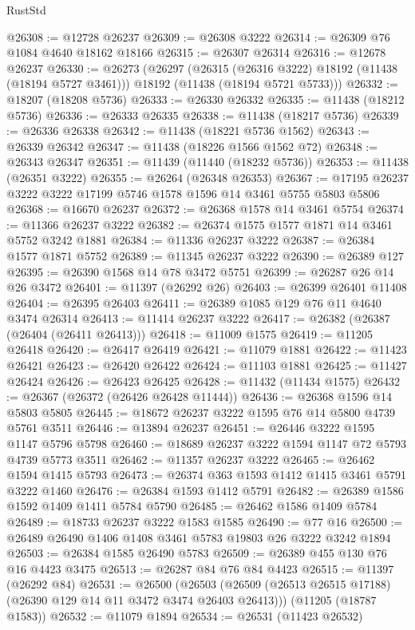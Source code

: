 \begin{lexlean}{RustStd}
\begin{coremodule}
@26308 := @12728 @26237
@26309 := @26308 @3222
@26314 := @26309 @76 @1084 @4640 @18162 @18166
@26315 := @26307 @26314
@26316 := @12678 @26237
@26330 := @26273
    (@26297
      (@26315 (@26316 @3222) @18192 (@11438 (@18194 @5727 @3461)))
      @18192
      (@11438 (@18194 @5721 @5733)))
@26332 := @18207 (@18208 @5736)
@26333 := @26330 @26332
@26335 := @11438 (@18212 @5736)
@26336 := @26333 @26335
@26338 := @11438 (@18217 @5736)
@26339 := @26336 @26338
@26342 := @11438 (@18221 @5736 @1562)
@26343 := @26339 @26342
@26347 := @11438 (@18226 @1566 @1562 @72)
@26348 := @26343 @26347
@26351 := @11439 (@11440 (@18232 @5736))
@26353 := @11438 (@26351 @3222)
@26355 := @26264 (@26348 @26353)
@26367 := @17195 @26237 @3222 @3222 @17199 @5746 @1578 @1596 @14 @3461 @5755 @5803 @5806
@26368 := @16670 @26237
@26372 := @26368 @1578 @14 @3461 @5754
@26374 := @11366 @26237 @3222
@26382 := @26374 @1575 @1577 @1871 @14 @3461 @5752 @3242 @1881
@26384 := @11336 @26237 @3222
@26387 := @26384 @1577 @1871 @5752
@26389 := @11345 @26237 @3222
@26390 := @26389 @127
@26395 := @26390 @1568 @14 @78 @3472 @5751
@26399 := @26287 @26 @14 @26 @3472
@26401 := @11397 (@26292 @26)
@26403 := @26399 @26401 @11408
@26404 := @26395 @26403
@26411 := @26389 @1085 @129 @76 @11 @4640 @3474 @26314
@26413 := @11414 @26237 @3222
@26417 := @26382 (@26387 (@26404 (@26411 @26413)))
@26418 := @11009 @1575
@26419 := @11205 @26418
@26420 := @26417 @26419
@26421 := @11079 @1881
@26422 := @11423 @26421
@26423 := @26420 @26422
@26424 := @11103 @1881
@26425 := @11427 @26424
@26426 := @26423 @26425
@26428 := @11432 (@11434 @1575)
@26432 := @26367 (@26372 (@26426 @26428 @11444))
@26436 := @26368 @1596 @14 @5803 @5805
@26445 := @18672 @26237 @3222 @1595 @76 @14 @5800 @4739 @5761 @3511
@26446 := @13894 @26237
@26451 := @26446 @3222 @1595 @1147 @5796 @5798
@26460 := @18689 @26237 @3222 @1594 @1147 @72 @5793 @4739 @5773 @3511
@26462 := @11357 @26237 @3222
@26465 := @26462 @1594 @1415 @5793
@26473 := @26374 @363 @1593 @1412 @1415 @3461 @5791 @3222 @1460
@26476 := @26384 @1593 @1412 @5791
@26482 := @26389 @1586 @1592 @1409 @1411 @5784 @5790
@26485 := @26462 @1586 @1409 @5784
@26489 := @18733 @26237 @3222 @1583 @1585
@26490 := @77 @16
@26500 := @26489 @26490 @1406 @1408 @3461 @5783 @19803 @26 @3222 @3242 @1894
@26503 := @26384 @1585 @26490 @5783
@26509 := @26389 @455 @130 @76 @16 @4423 @3475
@26513 := @26287 @84 @76 @84 @4423
@26515 := @11397 (@26292 @84)
@26531 := @26500
    (@26503 (@26509 (@26513 @26515 @17188) (@26390 @129 @14 @11 @3472 @3474 @26403 @26413)))
    (@11205 (@18787 @1583))
@26532 := @11079 @1894
@26534 := @26531 (@11423 @26532)

\end{coremodule}
\end{lexlean}
